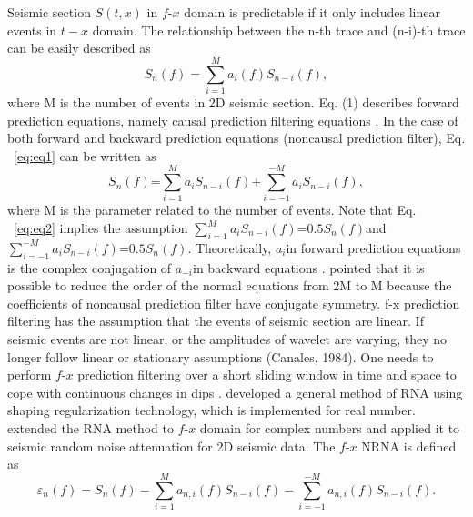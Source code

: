 Seismic section $S(t,x)$ in $f$-$x$ domain is predictable if it only 
includes linear events in $t-x$ domain. The relationship between the 
n-th trace and (n-i)-th trace can be easily described as
      \begin{equation}
          {{S}_{n}}(f)=\sum\limits_{i=1}^{M}{{{a}_{i}}(f){{S}_{n-i}}(f)},
        \label{eq:eq1}
      \end{equation}
where M is the number of events in 2D seismic section. Eq. (1) describes 
forward prediction equations, namely causal prediction filtering equations 
\cite[]{Gulunay2000}. In the case of both forward and backward prediction equations 
(noncausal prediction filter), Eq. ~\ref{eq:eq1} can be written as \cite[]{Spitz1991,Gulunay2000, Naghizadeh2009, Liu2012}
      \begin{equation}
          {{S}_{n}}(f)\text{=}\sum\limits_{i=1}^{M}{{{a}_{i}}{{S}_{n-i}}}(f)\text{+}\sum\limits_{i=-1}^{-M}{{{a}_{i}}{{S}_{n-i}}(f)},
        \label{eq:eq2}
      \end{equation}
where M is the parameter related to the number of events. Note that Eq. ~\ref{eq:eq2} 
implies the assumption $\sum\nolimits_{i=1}^{M}{{{a}_{i}}{{S}_{n-i}}(f)}\text{=0}.\text{5}{{S}_{n}}(f)$and$\sum\nolimits_{i=-1}^{-M}{{{a}_{i}}{{S}_{n-i}}(f)}\text{=0}.\text{5}{{S}_{n}}(f)$. Theoretically, ${{a}_{i}}$in forward prediction equations 
is the complex conjugation of ${{a}_{-i}}$in backward equations \cite[]{Galbraith1991}. 
\cite{Gulunay2000} pointed that it is possible to reduce the order of the normal equations 
from 2M to M because the coefficients of noncausal prediction filter have conjugate symmetry. 
f-x prediction filtering has the assumption that the events of seismic section are 
linear. If seismic events are not linear, or the amplitudes of wavelet are varying, 
they no longer follow linear or stationary assumptions (Canales, 1984). One needs to 
perform $f$-$x$ prediction filtering over a short sliding window in time and space to 
cope with continuous changes in dips \cite[]{Naghizadeh2009}. \cite{Fomel2009} 
developed a general method of RNA using shaping regularization technology, which 
is implemented for real number. \cite{Liu2012} extended the RNA method to $f$-$x$ 
domain for complex numbers and applied it to seismic random noise attenuation for 
2D seismic data. The $f$-$x$ NRNA is defined as \cite[]{Liu2012}
      \begin{equation}
          {{\varepsilon }_{n}}(f)={{S}_{n}}(f)-\sum\limits_{i=1}^{M}{{{a}_{n,i}}(f){{S}_{n-i}}(f)}-\sum\limits_{i=-1}^{-M}{{{a}_{n,i}}(f){{S}_{n-i}}(f)}.
        \label{eq:eq3}
      \end{equation}

